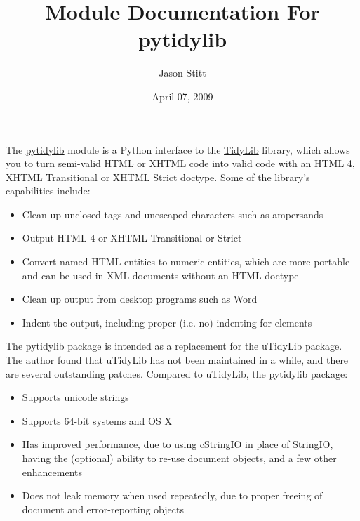 \documentclass[letterpaper,10pt,english]{howto}
\title{Module Documentation For pytidylib}
\date{April 07, 2009}
\author{Jason Stitt}
\begin{document}
\maketitle
\tableofcontents



The \href{http://countergram.com/software/pytidylib}{pytidylib} module is a Python interface to the \href{http://tidy.sourceforge.net/}{TidyLib} library, which allows you to turn semi-valid HTML or XHTML code into valid code with an HTML 4, XHTML Transitional or XHTML Strict doctype. Some of the library's capabilities include:
\begin{itemize}
\item {} 
Clean up unclosed tags and unescaped characters such as ampersands

\item {} 
Output HTML 4 or XHTML Transitional or Strict

\item {} 
Convert named HTML entities to numeric entities, which are more portable and can be used in XML documents without an HTML doctype

\item {} 
Clean up output from desktop programs such as Word

\item {} 
Indent the output, including proper (i.e. no) indenting for  elements

\end{itemize}

The pytidylib package is intended as a replacement for the uTidyLib package. The author found that uTidyLib has not been maintained in a while, and there are several outstanding patches. Compared to uTidyLib, the pytidylib package:
\begin{itemize}
\item {} 
Supports unicode strings

\item {} 
Supports 64-bit systems and OS X

\item {} 
Has improved performance, due to using cStringIO in place of StringIO, having the (optional) ability to re-use document objects, and a few other enhancements

\item {} 
Does not leak memory when used repeatedly, due to proper freeing of document and error-reporting objects

\end{itemize}
\end{document}
